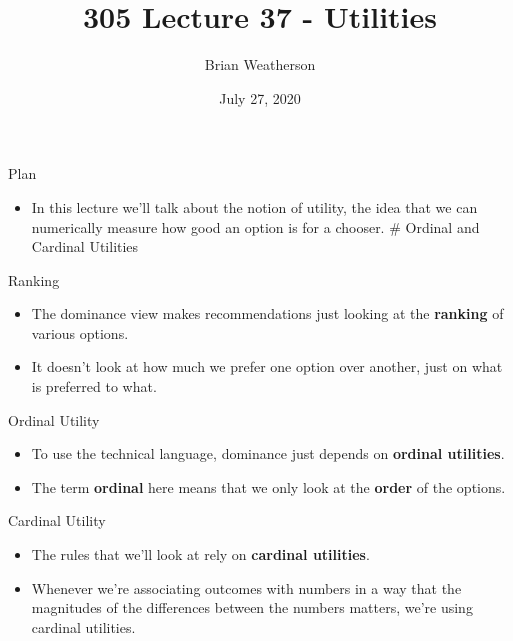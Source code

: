 \documentclass[
  ignorenonframetext,
]{beamer}
\title{305 Lecture 37 - Utilities}
\author{Brian Weatherson}
\date{July 27, 2020}
\providecommand{\tightlist}{%
  \setlength{\itemsep}{0pt}\setlength{\parskip}{0pt}}
\renewcommand{\,}{\text{, }}
\begin{document}
\frame{\titlepage}

\begin{frame}{Plan}
\protect\hypertarget{plan}{}

\begin{itemize}
\tightlist
\item
  In this lecture we'll talk about the notion of utility, the idea that
  we can numerically measure how good an option is for a chooser. \#
  Ordinal and Cardinal Utilities
\end{itemize}

\end{frame}

\begin{frame}{Ranking}
\protect\hypertarget{ranking}{}

\begin{itemize}
\tightlist
\item
  The dominance view makes recommendations just looking at the
  \textbf{ranking} of various options.
\item
  It doesn't look at how much we prefer one option over another, just on
  what is preferred to what.
\end{itemize}

\end{frame}

\begin{frame}{Ordinal Utility}
\protect\hypertarget{ordinal-utility}{}

\begin{itemize}
\tightlist
\item
  To use the technical language, dominance just depends on
  \textbf{ordinal utilities}.
\item
  The term \textbf{ordinal} here means that we only look at the
  \textbf{order} of the options.
\end{itemize}

\end{frame}

\begin{frame}{Cardinal Utility}
\protect\hypertarget{cardinal-utility}{}

\begin{itemize}
\tightlist
\item
  The rules that we'll look at rely on \textbf{cardinal utilities}.
\item
  Whenever we're associating outcomes with numbers in a way that the
  magnitudes of the differences between the numbers matters, we're using
  cardinal utilities.
\end{itemize}

\end{frame}
\end{document}
